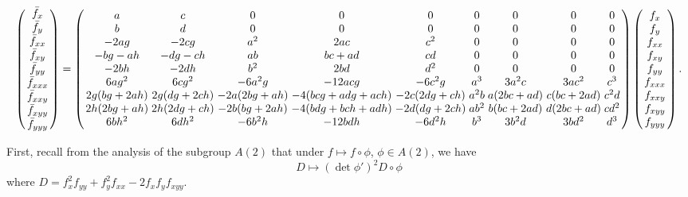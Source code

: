 \documentclass[review,onefignum,onetabnum]{siamonline190516}
\begin{document}
\begin{equation}
\arraycolsep=1.4pt
\label{eq:prolong}
\left(
\begin{array}{c}
  \bar f_x \\ \bar f_y \\ \bar f_{xx} \\ \bar f_{xy} \\ \bar f_{yy} \\ \bar f_{xxx} \\ \bar f_{xxy} \\ \bar f_{xyy} \\ \bar f_{yyy} 
 \end{array}
 \right)
 = 
\left(
\begin{array}{ccccccccc}
 a & c & 0 & 0 & 0 & 0 & 0 & 0 & 0 \\
 b & d & 0 & 0 & 0 & 0 & 0 & 0 & 0 \\
 -2 a g & -2 c g & a^2 & 2 a c & c^2 & 0 & 0 & 0 & 0 \\
 -b g-a h & -d g-c h & a b & b c+a d & c d & 0 & 0 & 0 & 0 \\
 -2 b h & -2 d h & b^2 & 2 b d & d^2 & 0 & 0 & 0 & 0 \\
 6 a g^2 & 6 c g^2 & -6 a^2 g & -12 a c g & -6 c^2 g & a^3 & 3 a^2 c & 3 a c^2 & c^3 \\
 2 g (b g+2 a h) & 2 g (d g+2 c h) & -2 a (2 b g+a h) & -4 (b c g+a d g+a c h) & -2 c (2 d
   g+c h) & a^2 b & a (2 b c+a d) & c (b c+2 a d) & c^2 d \\
 2 h (2 b g+a h) & 2 h (2 d g+c h) & -2 b (b g+2 a h) & -4 (b d g+b c h+a d h) & -2 d (d g+2
   c h) & a b^2 & b (b c+2 a d) & d (2 b c+a d) & c d^2 \\
 6 b h^2 & 6 d h^2 & -6 b^2 h & -12 b d h & -6 d^2 h & b^3 & 3 b^2 d & 3 b d^2 & d^3 \\
\end{array}
\right)\left(
\begin{array}{c}
f_x \\ f_y \\ f_{xx} \\ f_{xy} \\ f_{yy} \\ f_{xxx} \\ f_{xxy} \\ f_{xyy} \\ f_{yyy} 
 \end{array}
 \right).
 \end{equation}

First, recall from the analysis of the subgroup $A(2)$ that under $f\mapsto f\circ \phi$, $\phi\in A(2)$, we have 
\begin{equation}
\label{eq:D}
D \mapsto (\det \phi')^2 D\circ \phi
\end{equation}
where $D = f_{x}^2 f_{yy} + f_y^2 f_{xx} - 2 f_x f_y f_{xyy}$. 
\end{document}
